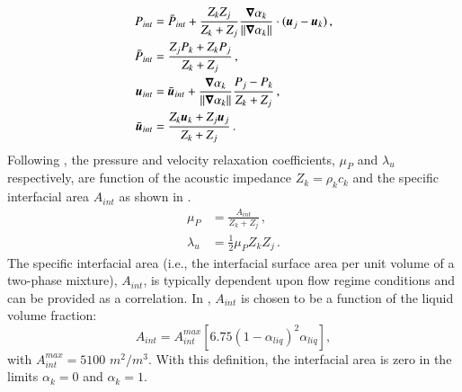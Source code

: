 \documentclass[preprint,10pt]{elsarticle}
\begin{document}
%
\begin{subequations}
\label{eq:int_variables_def}
\begin{align}
  \label{E-R:83}
  P_{int} &= \bar{P}_{int} + \frac{Z_{k}Z_{j}}{Z_{k}+Z_{j}} \frac{\boldsymbol\nabla \alpha_{k}}{|| \boldsymbol\nabla \alpha_{k} ||} \cdot (\boldsymbol u_{j}-\boldsymbol u_{k}) \,,
  \\
  \bar{P}_{int} &= \frac{Z_{j}P_{k}+Z_{k}P_{j}}{Z_{k}+Z_{j}} \,,
 \\
  \label{E-R:84}
  \boldsymbol u_{int} &= \bar{\boldsymbol u}_{int} +  \frac{\boldsymbol\nabla \alpha_{k}}{|| \boldsymbol\nabla \alpha_{k} ||} \frac{P_{j}-P_{k}}{Z_{k}+Z_{j}} \,,
  \\
  \bar{\boldsymbol u}_{int} &= \frac{Z_{k} \boldsymbol u_{k}+Z_{j}\boldsymbol u_{j}}{Z_{k}+Z_{j}} \,.
\end{align}
\end{subequations}
%
Following \cite{SEM}, the pressure and velocity relaxation coefficients, $\mu_P$  and $\lambda_u$ respectively, are function of the acoustic 
impedance $Z_k = \rho_k c_k$ and the specific interfacial area $A_{int}$ as shown in .
%
\begin{subequations}
\label{eq:relaxation_coeff}
\begin{align}
  \label{E-R:86}
  \mu_P &= \frac{A_{int}}{Z_{k}+Z_{j}}       \,,
  \\
  \label{E-R:85}
  \lambda_u &= \frac{1}{2} \mu_P Z_{k} Z_{j} \,.
\end{align}
\end{subequations}
%
The specific interfacial area (i.e., the interfacial surface area per unit
volume of a two-phase mixture), $A_{int}$, is typically dependent upon flow regime conditions and can be provided as a correlation. 
In \cite{SEM}, $A_{int}$ is chosen to be a function of the liquid volume fraction:
%
\begin{equation}\label{eq:Aint-sect4}
A_{int} = A_{int}^{max} \left[ 6.75 \left(1-\alpha_{liq} \right)^2 \alpha_{liq} \right],
\end{equation}
% 
with $A_{int}^{max} = 5100$ $m^2 / m^3$. With this definition, the interfacial area is zero in the limits $\alpha_{k} = 0$ and $\alpha_{k} = 1$. 
\end{document}
